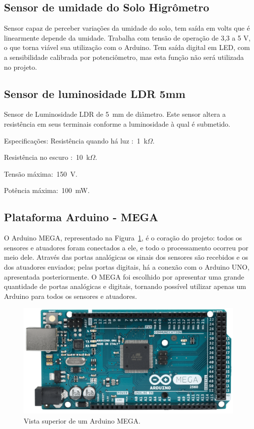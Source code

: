 \documentclass[a4paper,12pt]{report}
\begin{document}
		\subsection{Sensor de umidade do Solo Higrômetro}
		Sensor capaz de perceber variações da umidade do solo, tem saída em volts que é linearmente depende da umidade.
		Trabalha com tensão de operação de 3,3 a 5 V, o que torna viável sua utilização com o Arduino. Tem saída digital em LED, com a sensibilidade calibrada por potenciômetro, mas esta função não será utilizada no projeto.
	
		\subsection{Sensor de luminosidade LDR 5mm}
		
		Sensor de Luminosidade LDR de 5~mm de diâmetro. Este sensor altera a resistência em seus terminais conforme a luminosidade à qual é submetido.
		
		Especificações:
		Resistência quando há luz :~1~k$\Omega$.
		
		Resistência no escuro :~10~k$\Omega$.
		
		Tensão máxima:~150~V.
		
		Potência máxima:~100~mW.
		
		\subsection{Plataforma Arduino - MEGA}	
		 
		O Arduino MEGA, representado na Figura~\ref{fig:MEGA}, é o coração do projeto: todos os sensores e atuadores foram conectados a ele, e todo o processamento ocorreu por meio dele. Através das portas analógicas os sinais dos sensores são recebidos e os dos atuadores enviados; pelas portas digitais, há a conexão com o Arduino UNO, apresentada posteriormente. O MEGA foi escolhido por apresentar uma grande quantidade de portas analógicas e digitais, tornando possível utilizar apenas um Arduino para todos os sensores e atuadores. 
		
		\begin{figure}[!h]
			\centering
			\includegraphics[width=0.6\linewidth]{figs/ARDUINO_MEGA_A03}
			\caption{Vista superior de um Arduino MEGA.}
			\label{fig:MEGA}
		\end{figure}
		
\end{document}
